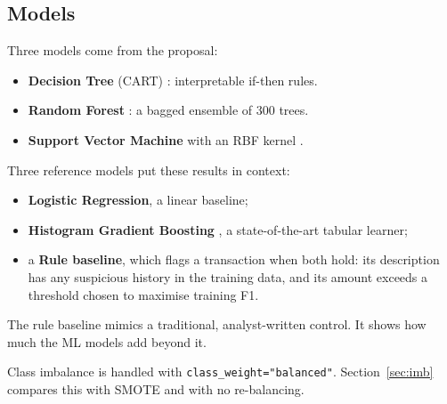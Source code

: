 \documentclass[12pt,a4paper]{article}
\begin{document}
\subsection{Models}
Three models come from the proposal:
\begin{itemize}[nosep]
\item \textbf{Decision Tree} (CART) \citep{breiman1984classification}: interpretable if-then rules.
\item \textbf{Random Forest} \citep{breiman2001random}: a bagged ensemble of 300 trees.
\item \textbf{Support Vector Machine} with an RBF kernel \citep{cortes1995support}.
\end{itemize}

Three reference models put these results in context:
\begin{itemize}[nosep]
\item \textbf{Logistic Regression}, a linear baseline;
\item \textbf{Histogram Gradient Boosting} \citep{friedman2001greedy}, a state-of-the-art tabular learner;
\item a \textbf{Rule baseline}, which flags a transaction when both hold: its description has any suspicious history in the training data, and its amount exceeds a threshold chosen to maximise training F1.
\end{itemize}
The rule baseline mimics a traditional, analyst-written control. It shows how much the ML models add beyond it.

Class imbalance is handled with \texttt{class\_weight="balanced"}. Section~\ref{sec:imb} compares this with SMOTE \citep{chawla2002smote} and with no re-balancing.
\end{document}
